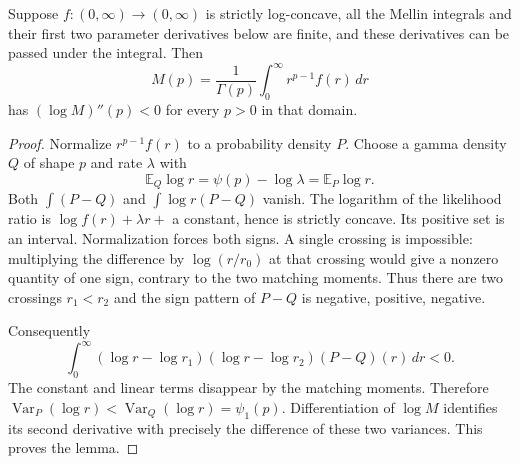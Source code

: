 \begin{lemma}\label{lem:mellin}
Suppose $f:(0,\infty)\to(0,\infty)$ is strictly log-concave, all the
Mellin integrals and their first two parameter derivatives below are
finite, and these derivatives can be passed under the integral. Then
\[
 M(p)=\frac1{\Gamma(p)}\int_0^\infty r^{p-1}f(r)\,dr
\]
has $(\log M)''(p)<0$ for every $p>0$ in that domain.
\end{lemma}
\begin{proof}
Normalize $r^{p-1}f(r)$ to a probability density $P$. Choose a gamma
density $Q$ of shape $p$ and rate $\lambda$ with
\[
 \mathbb E_Q\log r=\psi(p)-\log\lambda=\mathbb E_P\log r.
\]
Both $\int(P-Q)$ and $\int\log r(P-Q)$ vanish. The logarithm of the
likelihood ratio is $\log f(r)+\lambda r+$ a constant, hence is
strictly concave. Its positive set is an interval. Normalization
forces both signs. A single crossing is impossible: multiplying the
difference by $\log(r/r_0)$ at that crossing would give a nonzero
quantity of one sign, contrary to the two matching moments. Thus
there are two crossings $r_1<r_2$ and the sign pattern of $P-Q$ is
negative, positive, negative.

Consequently
\[
 \int_0^\infty
 (\log r-\log r_1)(\log r-\log r_2)(P-Q)(r)\,dr<0.
\]
The constant and linear terms disappear by the matching moments.
Therefore $\operatorname{Var}_P(\log r)<
\operatorname{Var}_Q(\log r)=\psi_1(p)$. Differentiation of $\log M$
identifies its second derivative with precisely the difference of
these two variances. This proves the lemma.
\end{proof}

